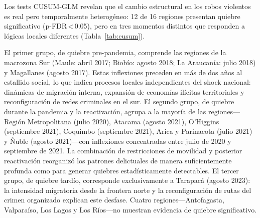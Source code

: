 \documentclass[12pt,a4paper]{article}
\begin{document}
Los tests CUSUM-GLM revelan que el cambio estructural en los robos violentos es real pero
temporalmente heterog\'eneo: 12 de 16 regiones presentan quiebre significativo
(p-FDR\,<\,0.05), pero en tres momentos distintos que responden a l\'ogicas locales
diferentes (Tabla~\ref{tab:cusum}).

El primer grupo, de quiebre pre-pandemia, comprende las regiones de la macrozona Sur
(Maule: abril 2017; Biob\'io: agosto 2018; La Araucan\'ia: julio 2018) y Magallanes
(agosto 2017). Estas inflexiones preceden en m\'as de dos a\~nos al estallido social,
lo que indica procesos locales independientes del shock nacional: din\'amicas de
migraci\'on interna, expansi\'on de econom\'ias il\'icitas territoriales y
reconfiguraci\'on de redes criminales en el sur. El segundo grupo, de quiebre durante
la pandemia y la reactivaci\'on, agrupa a la mayor\'ia de las regiones---Regi\'on
Metropolitana (julio 2020), Atacama (agosto 2021), O'Higgins (septiembre 2021), Coquimbo
(septiembre 2021), Arica y Parinacota (julio 2021) y \~Nuble (agosto 2021)---con
inflexiones concentradas entre julio de 2020 y septiembre de 2021. La combinaci\'on de
restricciones de movilidad y posterior reactivaci\'on reorganiz\'o los patrones
delictuales de manera suficientemente profunda como para generar quiebres
estad\'isticamente detectables. El tercer grupo, de quiebre tard\'io, corresponde
exclusivamente a Tarapac\'a (agosto 2023): la intensidad migratoria desde la frontera
norte y la reconfiguraci\'on de rutas del crimen organizado explican este desfase.
Cuatro regiones---Antofagasta, Valpara\'iso, Los Lagos y Los R\'ios---no muestran
evidencia de quiebre significativo.
\end{document}
